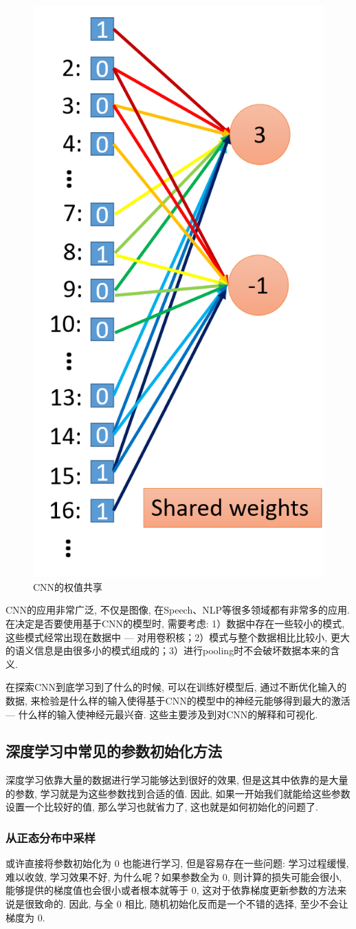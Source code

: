 \begin{figure}[h]
	\centering
	\includegraphics[width=.3\textwidth]{pics/share_weight.png}
	\caption{CNN的权值共享}
	\label{fig:share_weight}
\end{figure}

CNN的应用非常广泛, 不仅是图像, 在Speech、NLP等很多领域都有非常多的应用. 在决定是否要使用基于CNN的模型时, 需要考虑: 1）数据中存在一些较小的模式, 这些模式经常出现在数据中 --- 对用卷积核；2）模式与整个数据相比比较小, 更大的语义信息是由很多小的模式组成的；3）进行pooling时不会破坏数据本来的含义. 

在探索CNN到底学习到了什么的时候, 可以在训练好模型后, 通过不断优化输入的数据, 来检验是什么样的输入使得基于CNN的模型中的神经元能够得到最大的激活 --- 什么样的输入使神经元最兴奋. 这些主要涉及到对CNN的解释和可视化. 

\subsection{深度学习中常见的参数初始化方法}
深度学习依靠大量的数据进行学习能够达到很好的效果, 但是这其中依靠的是大量的参数, 学习就是为这些参数找到合适的值. 因此, 如果一开始我们就能给这些参数设置一个比较好的值, 那么学习也就省力了, 这也就是如何初始化的问题了. 

\subsubsection{从正态分布中采样}
或许直接将参数初始化为 0 也能进行学习, 但是容易存在一些问题: 学习过程缓慢, 难以收敛, 学习效果不好, 为什么呢？如果参数全为 0, 则计算的损失可能会很小, 能够提供的梯度值也会很小或者根本就等于 0, 这对于依靠梯度更新参数的方法来说是很致命的. 因此, 与全 0 相比, 随机初始化反而是一个不错的选择, 至少不会让梯度为 0. 

